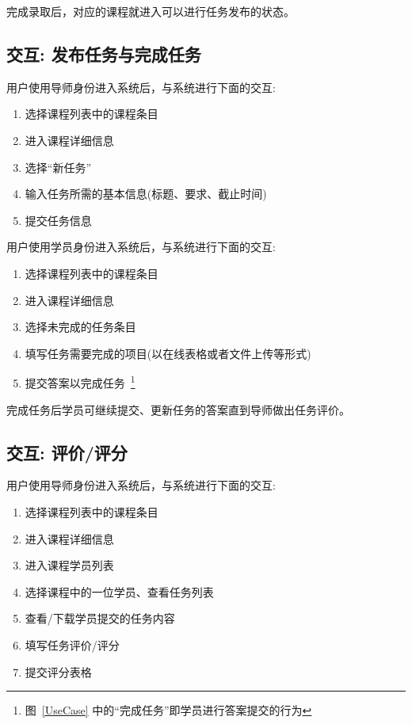 完成录取后，对应的课程就进入可以进行任务发布的状态。

\subsection {交互: 发布任务与完成任务}

用户使用导师身份进入系统后，与系统进行下面的交互:

\begin{enumerate}
  \item 选择课程列表中的课程条目
  \item 进入课程详细信息
  \item 选择“新任务”
  \item 输入任务所需的基本信息(标题、要求、截止时间)
  \item 提交任务信息
\end{enumerate}

用户使用学员身份进入系统后，与系统进行下面的交互:

\begin{enumerate}
  \item 选择课程列表中的课程条目
  \item 进入课程详细信息
  \item 选择未完成的任务条目
  \item 填写任务需要完成的项目(以在线表格或者文件上传等形式)
  \item 提交答案以完成任务~\footnote{图~\ref{UseCase} 中的“完成任务”即学员进行答案提交的行为}
\end{enumerate}

完成任务后学员可继续提交、更新任务的答案直到导师做出任务评价。

\subsection {交互: 评价/评分}

用户使用导师身份进入系统后，与系统进行下面的交互:

\begin{enumerate}
  \item 选择课程列表中的课程条目
  \item 进入课程详细信息
  \item 进入课程学员列表
  \item 选择课程中的一位学员、查看任务列表
  \item 查看/下载学员提交的任务内容
  \item 填写任务评价/评分
  \item 提交评分表格
\end{enumerate}

